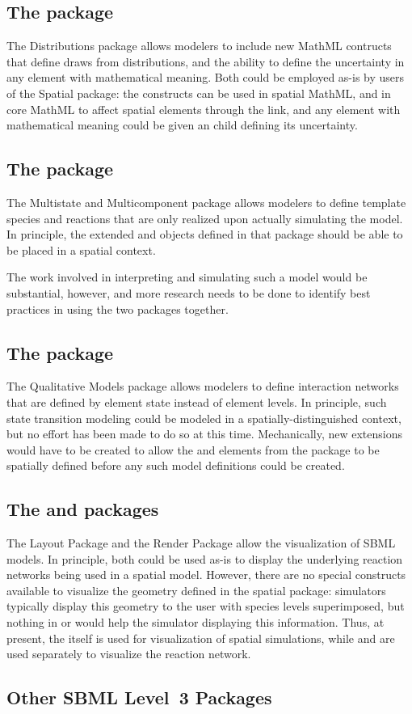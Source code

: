 \subsection{The  package}
The Distributions package allows modelers to include new MathML  contructs that define draws from distributions, and the ability to define the uncertainty in any element with mathematical meaning.  Both could be employed as-is by users of the Spatial package:  the  constructs can be used in spatial MathML, and in core MathML to affect spatial elements through the \SpatialSymbolReference link, and any element with mathematical meaning could be given an  child defining its uncertainty.


\subsection{The  package}
The Multistate and Multicomponent package allows modelers to define template species and reactions that are only realized upon actually simulating the model.  In principle, the extended \Species and \Reaction objects defined in that package should be able to be placed in a spatial context.

The work involved in interpreting and simulating such a model would be substantial, however, and more research needs to be done to identify best practices in using the two packages together.


\subsection{The  package}
The Qualitative Models  package allows modelers to define interaction networks that are defined by element state instead of element levels.  In principle, such state transition modeling could be modeled in a spatially-distinguished context, but no effort has been made to do so at this time.  Mechanically, new extensions would have to be created to allow the  and  elements from the  package to be spatially defined before any such model definitions could be created.


\subsection{The  and  packages}
The Layout Package and the Render Package allow the visualization of SBML models.  In principle, both could be used as-is to display the underlying reaction networks being used in a spatial model.  However, there are no special constructs available to visualize the geometry defined in the spatial package: simulators typically display this geometry to the user with species levels superimposed, but nothing in  or  would help the simulator displaying this information.  Thus, at present, the \Geometry itself is used for visualization of spatial simulations, while  and  are used separately to visualize the reaction network.



\subsection{Other SBML Level~3 Packages}
